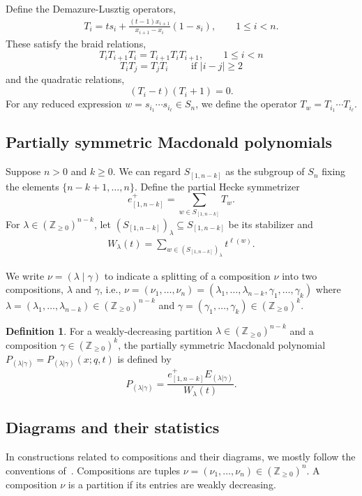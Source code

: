 \documentclass[11pt]{article}
\theoremstyle{definition}
\newtheorem{defi}[theo]{Definition}
\numberwithin{equation}{section}
\newcommand{\Z}{\mathbb{Z}}
\newcommand{\en}{e^+_{[1,n-k]}}
\newcommand{\Sn}{S_{[1,n-k]}}
\begin{document}
Define the Demazure-Lusztig operators,
\begin{align*}
T_i = ts_i + \frac{(t-1)x_{i+1}}{x_{i+1}-x_i}(1-s_i), \qquad 1\le i<n.
\end{align*}
These satisfy the braid relations,
\begin{equation}\label{braidrelations}T_i T_{i+1} T_i = T_{i+1} T_i T_{i+1}, \qquad 1\leq i < n\end{equation}
\begin{equation} T_i T_j = T_j T_i \qquad \text{ if } |i-j|\geq 2\end{equation}
and the quadratic relations,
\begin{equation}\label{quadratic}
(T_i-t)(T_i+1)=0.
\end{equation}
For any reduced expression $w=s_{i_1}\dotsm s_{i_\ell}\in S_n$, we define the operator $T_w=T_{i_1}\dotsm T_{i_\ell}$. 

\subsection{Partially symmetric Macdonald polynomials}
Suppose $n>0$ and $k\geq 0$. We can regard $\Sn$ as the subgroup of $S_n$ fixing the elements $\{n-k+1,\dotsc,n\}$. Define the partial Hecke symmetrizer
$$
\en=\sum_{w\in \Sn} T_w.
$$
For $\lambda\in(\Z_{\ge 0})^{n-k}$, let $(\Sn)_\lambda\subseteq \Sn$ be its stabilizer and
\begin{align*}
W_\lambda(t)=\sum_{w\in (\Sn)_\lambda} t^{\ell(w)}.
\end{align*}


We write $\nu = (\lambda \mid \gamma)$ to indicate a splitting of a composition $\nu$ into two compositions, $\lambda$ and $\gamma$, i.e., $\nu=(\nu_1,\dotsc,\nu_n)=(\lambda_1,\dotsc,\lambda_{n-k},\gamma_1,\dotsc,\gamma_k)$ where $\lambda=(\lambda_1,\dotsc,\lambda_{n-k})\in(\Z_{\ge 0})^{n-k}$ and $\gamma=(\gamma_1,\dotsc,\gamma_k)\in(\Z_{\ge 0})^k$.

\begin{defi}
For a weakly-decreasing partition $\lambda \in (\mathbb{Z}_{\geq 0})^{n-k}$ and a composition $\gamma\in (\Z_{\ge 0})^k$, the partially symmetric Macdonald polynomial $P_{(\lambda|\gamma)}=P_{(\lambda|\gamma)}(x;q,t)$ is defined by
\[
P_{(\lambda|\gamma)} = \frac{\en  E_{(\lambda|\gamma)}}{W_\lambda(t)}.
\]
\end{defi}





\subsection{Diagrams and their statistics}\label{diagrams} In constructions related to compositions and their diagrams, we mostly follow the conventions of~\cite{MR2405160}. Compositions are tuples $\nu=(\nu_1,\dotsc,\nu_n)\in(\Z_{\ge 0})^n$. A composition $\nu$ is a partition if its entries are weakly decreasing. 
\end{document}
